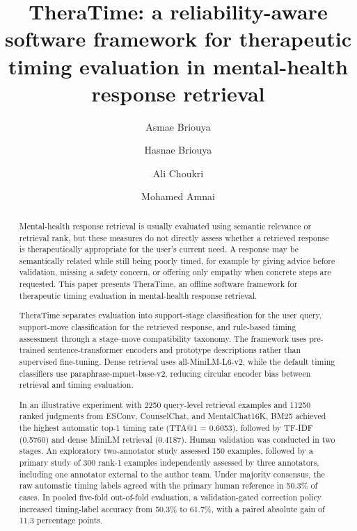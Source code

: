 \documentclass[preprint,12pt,a4paper]{elsarticle}
\begin{document}
\begin{frontmatter}

\title{TheraTime: a reliability-aware software framework for therapeutic timing evaluation in mental-health response retrieval}

\author[label1]{Asmae Briouya}
\author[label1]{Hasnae Briouya}
\author[label1]{Ali Choukri}
\author[label1]{Mohamed Amnai}


\begin{abstract}
Mental-health response retrieval is usually evaluated using semantic relevance or retrieval rank, but these measures do not directly assess whether a retrieved response is therapeutically appropriate for the user's current need. A response may be semantically related while still being poorly timed, for example by giving advice before validation, missing a safety concern, or offering only empathy when concrete steps are requested. This paper presents TheraTime, an offline software framework for therapeutic timing evaluation in mental-health response retrieval.

TheraTime separates evaluation into support-stage classification for the user query, support-move classification for the retrieved response, and rule-based timing assessment through a stage--move compatibility taxonomy. The framework uses pre-trained sentence-transformer encoders and prototype descriptions rather than supervised fine-tuning. Dense retrieval uses all-MiniLM-L6-v2, while the default timing classifiers use paraphrase-mpnet-base-v2, reducing circular encoder bias between retrieval and timing evaluation.

In an illustrative experiment with 2250 query-level retrieval examples and 11250 ranked judgments from ESConv, CounselChat, and MentalChat16K, BM25 achieved the highest automatic top-1 timing rate (TTA@1 = 0.6053), followed by TF-IDF (0.5760) and dense MiniLM retrieval (0.4187). Human validation was conducted in two stages. An exploratory two-annotator study assessed 150 examples, followed by a primary study of 300 rank-1 examples independently assessed by three annotators, including one annotator external to the author team. Under majority consensus, the raw automatic timing labels agreed with the primary human reference in 50.3\% of cases. In pooled five-fold out-of-fold evaluation, a validation-gated correction policy increased timing-label accuracy from 50.3\% to 61.7\%, with a paired absolute gain of 11.3 percentage points.


\end{abstract}
\end{frontmatter}
\end{document}
